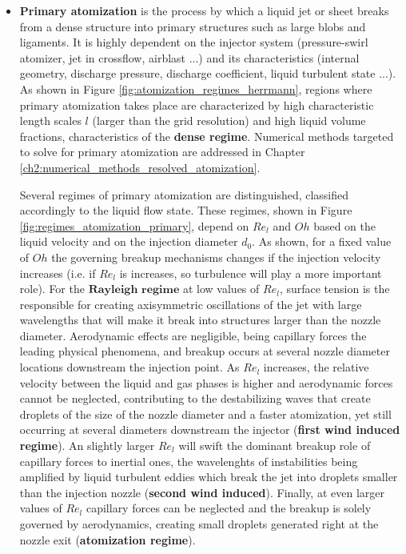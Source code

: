 \begin{itemize}

	\item \textbf{Primary atomization} is the process by which a liquid jet or sheet breaks from a dense structure into primary structures such as large blobs and ligaments. It is highly dependent on the injector system (pressure-swirl atomizer, jet in crossflow, airblast ...) and its characteristics (internal geometry, discharge pressure, discharge coefficient, liquid turbulent state ...). As shown in Figure \ref{fig:atomization_regimes_herrmann}, regions where primary atomization takes place are characterized by high characteristic length scales $l$ (larger than the grid resolution) and high liquid volume fractions, characteristics of the \textbf{dense regime}. Numerical methods targeted to solve for primary atomization are addressed in Chapter \ref{ch2:numerical_methods_resolved_atomization}. 
	
	Several regimes of primary atomization are distinguished, classified accordingly to the liquid flow state. These regimes, shown in Figure \ref{fig:regimes_atomization_primary}, depend on $Re_l$ and $Oh$ based on the liquid velocity and on the injection diameter $d_0$. As shown, for a fixed value of $Oh$ the governing breakup mechanisms changes if the injection velocity increases (i.e. if $Re_l$ is increases, so turbulence will play a more important role). For the $\textbf{Rayleigh regime}$ at low values of $Re_l$, surface tension is the responsible for creating axisymmetric oscillations of the jet with large wavelengths that will make it break into structures larger than the nozzle diameter. Aerodynamic effects are negligible, being capillary forces the leading physical phenomena, and breakup occurs at several nozzle diameter locations downstream the injection point. As $Re_l$ increases, the relative velocity between the liquid and gas phases is higher and aerodynamic forces cannot be neglected, contributing to the destabilizing waves that create droplets of the size of the nozzle diameter and a faster atomization, yet still occurring at several diameters downstream the injector (\textbf{first wind induced regime}). An slightly larger $Re_l$ will swift the dominant breakup role of capillary forces to inertial ones, the wavelenghts of instabilities being amplified by liquid turbulent eddies which break the jet into droplets smaller than the injection nozzle (\textbf{second wind induced}). Finally, at even larger values of $Re_l$ capillary forces can be neglected and the breakup is solely governed by aerodynamics, creating small droplets generated right at the nozzle exit (\textbf{atomization regime}).


\end{itemize}
